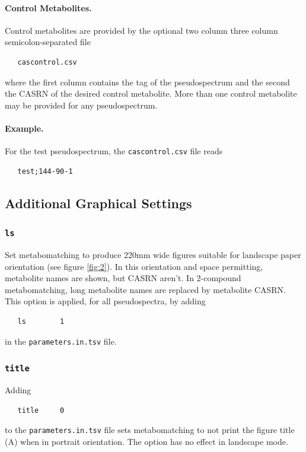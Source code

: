 \documentclass[a4paper,11pt]{article}
\begin{document}
\paragraph{Control Metabolites.} Control metabolites are provided by the optional two column three column semicolon-separated file
\begin{verbatim}
   cascontrol.csv
\end{verbatim}
where the first column contains the tag of the pseudospectrum and the second the CASRN of the desired control metabolite. More than one control metabolite may be provided for any pseudospectrum.
\paragraph{Example.} For the test pseudospectrum, the \verb|cascontrol.csv| file reads
\begin{verbatim}
   test;144-90-1
\end{verbatim}
\subsection{Additional Graphical Settings}
\subsubsection{ \texttt{ls}}
Set metabomatching to produce 220mm wide figures suitable for landscape paper orientation (see figure \ref{fig:2}). In this orientation and space permitting, metabolite names are shown, but CASRN aren't. In 2-compound metabomatching, long metabolite names are replaced by metabolite CASRN. This option is applied, for all pseudospectra, by adding
\begin{verbatim}
   ls        1
\end{verbatim}
in the \verb|parameters.in.tsv| file.
\subsubsection{ \texttt{title}}
Adding
\begin{verbatim}
   title     0
\end{verbatim}
to the \verb|parameters.in.tsv| file sets metabomatching to not print the figure title (A) when in portrait orientation. The option has no effect in landscape mode.
\end{document}
